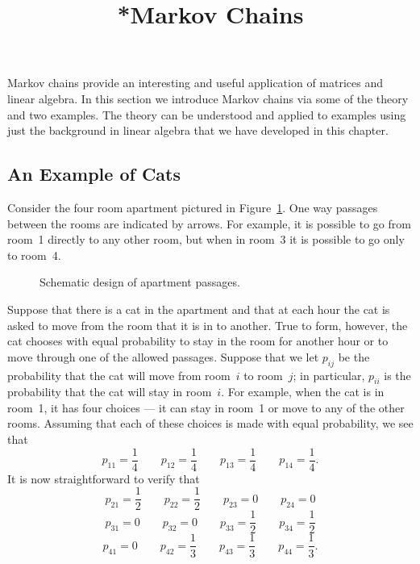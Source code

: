 \documentclass{ximera}
\title{*Markov Chains}
\begin{document}
\begin{abstract}
\end{abstract}
\maketitle


\label{S:TransitionApplied}

Markov chains provide an interesting and useful application of matrices and
linear algebra.  In this section we introduce Markov chains via some of the
theory and two examples.  The theory can be understood and applied to examples
using just the background in linear algebra that we have developed in this
chapter.


\subsection*{An Example of Cats}

Consider the four room apartment pictured in Figure~\ref{F:apart}.  One way
passages between the rooms are indicated by arrows.  For example, it is
possible to go from room~1 directly to any other room, but when in room~3
it is possible to go only to room~4.

\begin{figure}[htb]
        \centerline{%
        }
        \caption{Schematic design of apartment passages.}
        \label{F:apart}
\end{figure}

Suppose that there is a cat in the apartment and that at each hour the cat is
asked to move from the room that it is in to another.  True to form, however,
the cat chooses with equal probability to stay in the room for another hour
or to move through one of the allowed passages.  Suppose that we let $p_{ij}$
be the probability that the cat will move from room~$i$ to room~$j$; in
particular, $p_{ii}$ is the probability that the cat will stay in room~$i$.
For example, when the cat is in room~1, it has four choices  --- it can
stay in room~1 or move to any of the other rooms.  Assuming that each of
these choices is made with equal probability, we see that
\[
p_{11} = \frac{1}{4} \qquad p_{12} = \frac{1}{4} \qquad p_{13} =
\frac{1}{4} \qquad p_{14} = \frac{1}{4}.
\]
It is now straightforward to verify that
\[
p_{21} = \frac{1}{2} \qquad p_{22} = \frac{1}{2} \qquad p_{23} = 0
\qquad p_{24} = 0
\]
\[
p_{31} = 0 \qquad p_{32} = 0 \qquad p_{33} =
\frac{1}{2} \qquad p_{34} = \frac{1}{2}
\]
\[
p_{41} = 0 \qquad p_{42} = \frac{1}{3} \qquad p_{43} =
\frac{1}{3} \qquad p_{44} = \frac{1}{3}.
\]
\end{document}
